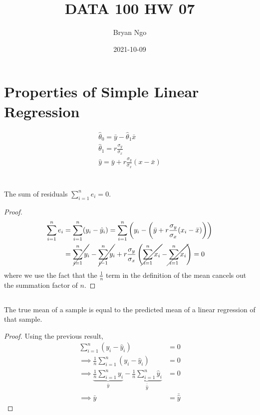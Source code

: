 \documentclass{article}
\title{DATA 100 HW 07}
\author{Bryan Ngo}
\date{2021-10-09}
\begin{document}
\maketitle

\section*{Properties of Simple Linear Regression}

\begin{gather}
    \hat{\theta}_0 = \bar{y} - \hat{\theta}_1 \bar{x} \\
    \hat{\theta}_1 = r \frac{\sigma_y}{\sigma_x} \\
    \hat{y} = \bar{y} + r \frac{\sigma_y}{\sigma_x} (x - \bar{x})
\end{gather}

\section{}

\subsection{}

\begin{theorem}
    The sum of residuals \(\sum_{i = 1}^n e_i = 0\).
\end{theorem}
\begin{proof}
    \begin{align}
        \sum_{i = 1}^n e_i &= \sum_{i = 1}^n (y_i - \hat{y}_i) = \sum_{i = 1}^n \left(y_i - \left(\bar{y} + r \frac{\sigma_y}{\sigma_x} (x_i - \bar{x})\right)\right) \\
        &= \cancel{\sum_{i = 1}^n y_i} - \cancel{\sum_{i - 1}^n y_i} + r \frac{\sigma_y}{\sigma_x} \left(\cancel{\sum_{i = 1}^n x_i} - \cancel{\sum_{i = 1}^n x_i}\right) = 0
    \end{align}
    where we use the fact that the \(\frac{1}{n}\) term in the definition of the mean cancels out the summation factor of \(n\).
\end{proof}

\subsection{}

\begin{theorem}
    The true mean of a sample is equal to the predicted mean of a linear regression of that sample.
\end{theorem}
\begin{proof}
    Using the previous result,
    \begin{align}
        \sum_{i = 1}^n (y_i - \hat{y}_i) &= 0 \\
        \implies \frac{1}{n} \sum_{i = 1}^n (y_i - \hat{y}_i) &= 0 \\
        \implies \underbrace{\frac{1}{n} \sum_{i = 1}^n y_i}_{\bar{y}} - \underbrace{\frac{1}{n} \sum_{i = 1}^n \hat{y}_i}_{\bar{\hat{y}}} &= 0 \\
        \implies \bar{y} &= \bar{\hat{y}}
    \end{align}
\end{proof}
\end{document}
